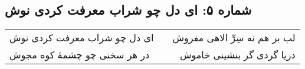 \begin{center}
\section*{شماره ۵: ای دل چو شراب معرفت کردی نوش}
\label{sec:005}
\begin{longtable}{l p{0.5cm} r}
ای دل چو شراب معرفت کردی نوش
&&
لب بر هم نه سِرِّ الاهی مفروش
\\
در هر سخنی چو چشمهٔ کوه مجوش
&&
دریا گردی گر بنشینی خاموش
\\
\end{longtable}
\end{center}
